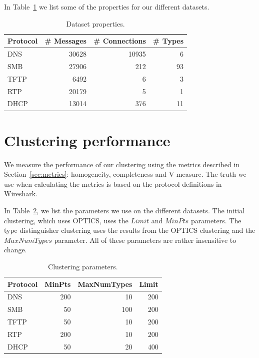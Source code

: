 \documentclass[a4paper]{report}
\begin{document}
In Table~\ref{tab:datasets} we list some of the properties for our different
datasets.

\begin{table}[h]
    \centering
    \captionsetup{width=0.8\textwidth}
    \caption{Dataset properties.}
    \begin{tabular}{| l | r | r | r |}
        \hline
        \textbf{Protocol}&\textbf{\# Messages}&\textbf{\# Connections}&\textbf{\# Types}\\ \hline
        DNS         & 30628         & 10935         & 6         \\ \hline
        SMB         & 27906         & 212           & 93        \\ \hline
        TFTP        & 6492          & 6             & 3         \\ \hline
        RTP         & 20179         & 5             & 1         \\ \hline
        DHCP        & 13014         & 376           & 11        \\ \hline
    \end{tabular}
    \label{tab:datasets}
\end{table}

\section{Clustering performance}
\label{sec:clustperf}
We measure the performance of our clustering using the metrics described in
Section~\ref{sec:metrics}: homogeneity, completeness and V-measure. The truth we
use when calculating the metrics is based on the protocol definitions in
Wireshark.

In Table~\ref{tab:clusterparams}, we list the parameters we use on the
different datasets. The initial clustering, which uses OPTICS, uses the
$Limit$ and $MinPts$ parameters. The type distinguisher clustering uses
the results from the OPTICS clustering and the $MaxNumTypes$ parameter. All of
these parameters are rather insensitive to change.

\begin{table}[h]
    \centering
    \captionsetup{width=0.8\textwidth}
    \caption{Clustering parameters.}
    \begin{tabular}{| l | r | r | r |}
        \hline
        \textbf{Protocol}&\textbf{MinPts}&\textbf{MaxNumTypes}&\textbf{Limit} \\ \hline
        DNS & 200 & 10 & 200 \\ \hline
        SMB & 50 & 100 & 200 \\ \hline
        TFTP & 50 & 10 & 200 \\ \hline
        RTP & 200 & 10 & 200 \\ \hline
        DHCP & 50 & 20 & 400 \\ \hline
    \end{tabular}
    \label{tab:clusterparams}
\end{table}
\end{document}
